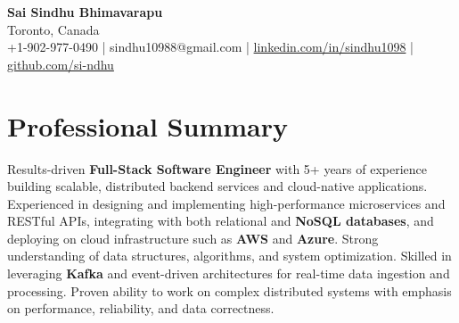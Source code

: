 \documentclass[letterpaper,11pt]{article}
\begin{document}
\begin{center}
  {\Large \textbf{Sai Sindhu Bhimavarapu}} \\
  Toronto, Canada \\
  +1-902-977-0490 \enspace | \enspace sindhu10988@gmail.com \enspace | \enspace \href{https://www.linkedin.com/in/sindhu1098/}{linkedin.com/in/sindhu1098} \enspace | \enspace \href{https://github.com/si-ndhu}{github.com/si-ndhu}
\end{center}

\section{Professional Summary}
  \begin{itemize}[leftmargin=0.15in, label={}]
    \small{\item{
     Results-driven \textbf{Full-Stack Software Engineer} with 5+ years of experience building scalable, distributed backend services and cloud-native applications. Experienced in designing and implementing high-performance microservices and RESTful APIs, integrating with both relational and \textbf{NoSQL databases}, and deploying on cloud infrastructure such as \textbf{AWS} and \textbf{Azure}. Strong understanding of data structures, algorithms, and system optimization. Skilled in leveraging \textbf{Kafka} and event-driven architectures for real-time data ingestion and processing. Proven ability to work on complex distributed systems with emphasis on performance, reliability, and data correctness.
    }}
  \end{itemize}
\vspace{-16pt}

\end{document}
